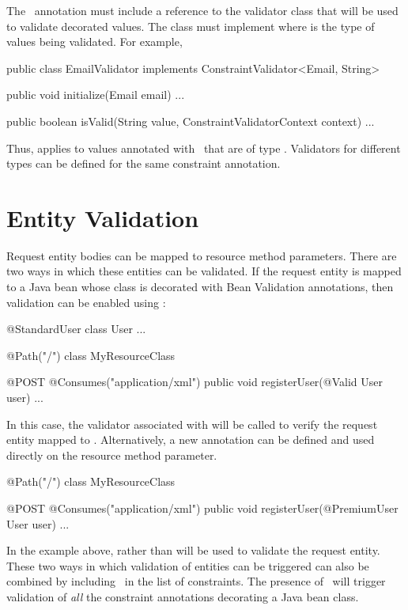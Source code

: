 The \Constraint\ annotation must include a reference to the validator class that will be used to validate decorated values. The  class must implement  where  is the type of values being validated. For example, 

\begin{listing}{1}
public class EmailValidator implements ConstraintValidator<Email, String> {
  public void initialize(Email email) { 
    ...
  }

  public boolean isValid(String value, ConstraintValidatorContext context) {
   ...
  }
}
\end{listing}

Thus,  applies to values annotated with \Email\ that are of type . Validators for different types can be defined for the same constraint annotation. 

\section{Entity Validation}

Request entity bodies can be mapped to resource method parameters. There are two ways in which these entities can be validated. If the request entity is mapped to a Java bean whose class is decorated with Bean Validation annotations, then validation can be enabled using \Valid:

\begin{listing}{1}
@StandardUser
class User { ... }

@Path("/")
class MyResourceClass {

  @POST
  @Consumes("application/xml")
  public void registerUser(@Valid User user) {
    ...
  }
}
\end{listing}

In this case, the validator associated with  will be called to verify the request entity mapped to . Alternatively, a new annotation can be defined and used directly on the resource method parameter. 

\begin{listing}{1}
@Path("/")
class MyResourceClass {

  @POST
  @Consumes("application/xml")
  public void registerUser(@PremiumUser User user) {
    ...
  }
}
\end{listing}

In the example above,  rather than  will be used to validate the request entity. These two ways in which validation of entities can be triggered can also be combined by including \Valid\ in the list of constraints. The presence of \Valid\ will trigger validation of \emph{all} the constraint annotations decorating a Java bean class.

